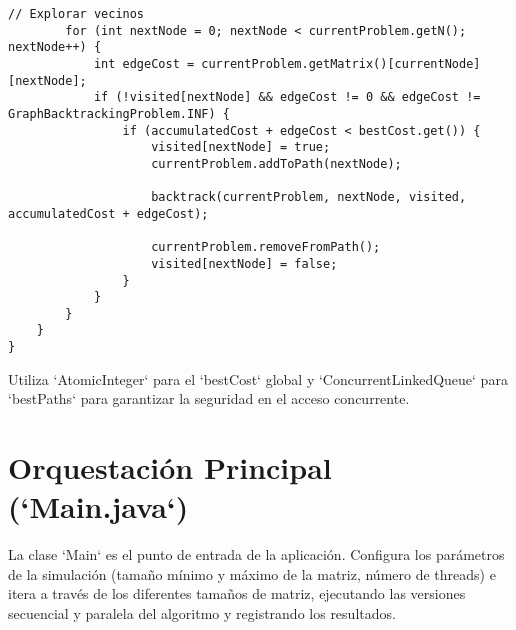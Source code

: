 \documentclass[12pt]{article}
\begin{document}
\begin{lstlisting}[caption={Implementación Paralela con Threads en Java (`ParallelGraphSolver.java`)}]
        // Explorar vecinos
        for (int nextNode = 0; nextNode < currentProblem.getN(); nextNode++) {
            int edgeCost = currentProblem.getMatrix()[currentNode][nextNode];
            if (!visited[nextNode] && edgeCost != 0 && edgeCost != GraphBacktrackingProblem.INF) {
                if (accumulatedCost + edgeCost < bestCost.get()) {
                    visited[nextNode] = true;
                    currentProblem.addToPath(nextNode);
                    
                    backtrack(currentProblem, nextNode, visited, accumulatedCost + edgeCost);
                    
                    currentProblem.removeFromPath();
                    visited[nextNode] = false;
                }
            }
        }
    }
}
\end{lstlisting}
Utiliza `AtomicInteger` para el `bestCost` global y `ConcurrentLinkedQueue` para `bestPaths` para garantizar la seguridad en el acceso concurrente.

\section*{Orquestación Principal (`Main.java`)}
La clase `Main` es el punto de entrada de la aplicación. Configura los parámetros de la simulación (tamaño mínimo y máximo de la matriz, número de threads) e itera a través de los diferentes tamaños de matriz, ejecutando las versiones secuencial y paralela del algoritmo y registrando los resultados.
\end{document}
